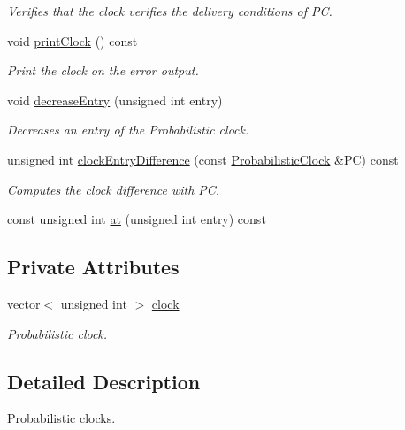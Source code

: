 \begin{DoxyCompactItemize}
\begin{DoxyCompactList}\small\item\em Verifies that the clock verifies the delivery conditions of PC. \end{DoxyCompactList}\item 
void \hyperlink{class_probabilistic_clock_a1169d9d5442d55c4dd4e2e730bc2b008}{print\+Clock} () const
\begin{DoxyCompactList}\small\item\em Print the clock on the error output. \end{DoxyCompactList}\item 
void \hyperlink{class_probabilistic_clock_aaa864cb9c0e2cfcf0bf28a3f534e0c6a}{decrease\+Entry} (unsigned int entry)
\begin{DoxyCompactList}\small\item\em Decreases an entry of the Probabilistic clock. \end{DoxyCompactList}\item 
unsigned int \hyperlink{class_probabilistic_clock_ad119fc48edd9537cfdb0ab77e640f614}{clock\+Entry\+Difference} (const \hyperlink{class_probabilistic_clock}{Probabilistic\+Clock} \&PC) const
\begin{DoxyCompactList}\small\item\em Computes the clock difference with PC. \end{DoxyCompactList}\item 
const unsigned int \hyperlink{class_probabilistic_clock_a81a017c569c1a57e5c567b701a64e5c9}{at} (unsigned int entry) const
\end{DoxyCompactItemize}
\subsection*{Private Attributes}
\begin{DoxyCompactItemize}
\item 
vector$<$ unsigned int $>$ \hyperlink{class_probabilistic_clock_a4839958d0e2368cec8bb159b69ac0e76}{clock}
\begin{DoxyCompactList}\small\item\em Probabilistic clock. \end{DoxyCompactList}\end{DoxyCompactItemize}


\subsection{Detailed Description}
Probabilistic clocks. 

